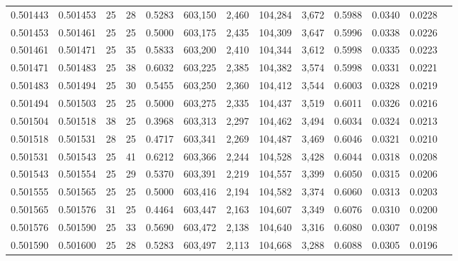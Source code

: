 \begin{tabular}{rrrrrrrrrrrrr}
0.501443 & 0.501453 &    25 &  28 &                                     0.5283 & 603,150 &   2,460 & 104,284 &   3,672 & 0.5988 & 0.0340 & 0.0228 \\
0.501453 & 0.501461 &    25 &  25 &                                     0.5000 & 603,175 &   2,435 & 104,309 &   3,647 & 0.5996 & 0.0338 & 0.0226 \\
0.501461 & 0.501471 &    25 &  35 &                                     0.5833 & 603,200 &   2,410 & 104,344 &   3,612 & 0.5998 & 0.0335 & 0.0223 \\
0.501471 & 0.501483 &    25 &  38 &                                     0.6032 & 603,225 &   2,385 & 104,382 &   3,574 & 0.5998 & 0.0331 & 0.0221 \\
0.501483 & 0.501494 &    25 &  30 &                                     0.5455 & 603,250 &   2,360 & 104,412 &   3,544 & 0.6003 & 0.0328 & 0.0219 \\
0.501494 & 0.501503 &    25 &  25 &                                     0.5000 & 603,275 &   2,335 & 104,437 &   3,519 & 0.6011 & 0.0326 & 0.0216 \\
0.501504 & 0.501518 &    38 &  25 &                                     0.3968 & 603,313 &   2,297 & 104,462 &   3,494 & 0.6034 & 0.0324 & 0.0213 \\
0.501518 & 0.501531 &    28 &  25 &                                     0.4717 & 603,341 &   2,269 & 104,487 &   3,469 & 0.6046 & 0.0321 & 0.0210 \\
0.501531 & 0.501543 &    25 &  41 &                                     0.6212 & 603,366 &   2,244 & 104,528 &   3,428 & 0.6044 & 0.0318 & 0.0208 \\
0.501543 & 0.501554 &    25 &  29 &                                     0.5370 & 603,391 &   2,219 & 104,557 &   3,399 & 0.6050 & 0.0315 & 0.0206 \\
0.501555 & 0.501565 &    25 &  25 &                                     0.5000 & 603,416 &   2,194 & 104,582 &   3,374 & 0.6060 & 0.0313 & 0.0203 \\
0.501565 & 0.501576 &    31 &  25 &                                     0.4464 & 603,447 &   2,163 & 104,607 &   3,349 & 0.6076 & 0.0310 & 0.0200 \\
0.501576 & 0.501590 &    25 &  33 &                                     0.5690 & 603,472 &   2,138 & 104,640 &   3,316 & 0.6080 & 0.0307 & 0.0198 \\
0.501590 & 0.501600 &    25 &  28 &                                     0.5283 & 603,497 &   2,113 & 104,668 &   3,288 & 0.6088 & 0.0305 & 0.0196 \\

\end{tabular}
